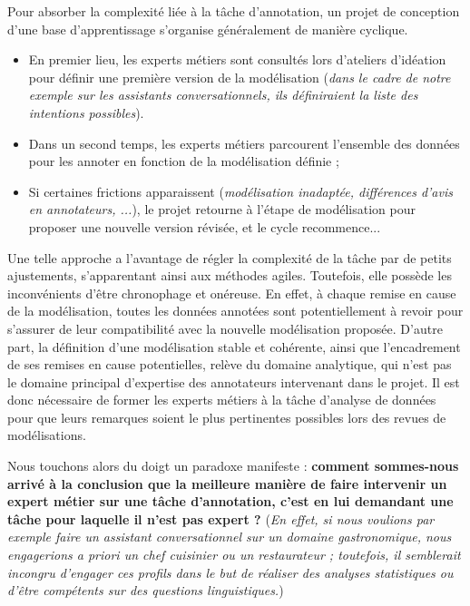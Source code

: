 		Pour absorber la complexité liée à la tâche d'annotation, un projet de conception d'une base d'apprentissage s'organise généralement de manière cyclique.
		\begin{itemize}
			\item En premier lieu, les experts métiers sont consultés lors d'ateliers d'idéation pour définir une première version de la modélisation (\textit{dans le cadre de notre exemple sur les assistants conversationnels, ils définiraient la liste des intentions possibles}).
			\item Dans un second temps, les experts métiers parcourent l'ensemble des données pour les annoter en fonction de la modélisation définie ;
			\item Si certaines frictions apparaissent (\textit{modélisation inadaptée, différences d'avis en annotateurs, ...}), le projet retourne à l'étape de modélisation pour proposer une nouvelle version révisée, et le cycle recommence...
		\end{itemize}
		
		Une telle approche a l'avantage de régler la complexité de la tâche par de petits ajustements, s'apparentant ainsi aux méthodes agiles.
		Toutefois, elle possède les inconvénients d'être chronophage et onéreuse.
		En effet, à chaque remise en cause de la modélisation, toutes les données annotées sont potentiellement à revoir pour s'assurer de leur compatibilité avec la nouvelle modélisation proposée.
		D'autre part, la définition d'une modélisation stable et cohérente, ainsi que l'encadrement de ses remises en cause potentielles, relève du domaine analytique, qui n'est pas le domaine principal d'expertise des annotateurs intervenant dans le projet.
		Il est donc nécessaire de former les experts métiers à la tâche d'analyse de données pour que leurs remarques soient le plus pertinentes possibles lors des revues de modélisations.
		\newline
		
		Nous touchons alors du doigt un paradoxe manifeste : \textbf{comment sommes-nous arrivé à la conclusion que la meilleure manière de faire intervenir un expert métier sur une tâche d'annotation, c'est en lui demandant une tâche pour laquelle il n'est pas expert ?}
		(\textit{En effet, si nous voulions par exemple faire un assistant conversationnel sur un domaine gastronomique, nous engagerions a priori un chef cuisinier ou un restaurateur ;
		toutefois, il semblerait incongru d'engager ces profils dans le but de réaliser des analyses statistiques ou d'être compétents sur des questions linguistiques.})
		
